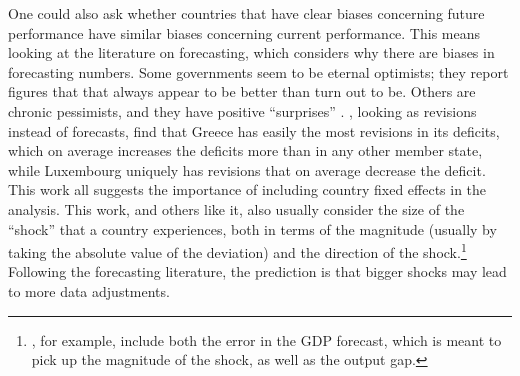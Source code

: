 \documentclass[]{article}
\begin{document}
One could also ask whether countries that have clear biases concerning future performance have similar biases concerning current performance. This means looking at the literature on forecasting, which  considers why there are biases in forecasting numbers. Some governments seem to be eternal optimists; they report figures that that always appear to be better than turn out to be. Others are chronic pessimists, and they have positive ``surprises'' \citep[e.g.][]{Strauchetal2004}. \cite{DeCastro2013}, looking as revisions instead of forecasts, find that Greece has easily the most revisions in its deficits, which on average increases the deficits more than in any other member state, while Luxembourg uniquely has revisions that on average decrease the deficit. This work all suggests the importance of including country fixed effects in the analysis.  This work, and others like it, also usually consider the size of the ``shock'' that a country experiences, both in terms of the magnitude (usually by taking the absolute value of the deviation) and the direction of the shock.\footnote{\cite{PinaVenes2011}, for example, include both the error in the GDP forecast, which is meant to pick up the magnitude of the shock, as well as the output gap.}  Following the forecasting literature, the prediction is that bigger shocks may lead to more data adjustments.  
\end{document}
